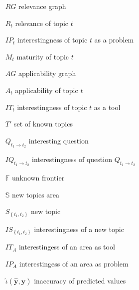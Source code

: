 \begin{itemize}
\item [$RG$] relevance graph
\item [$R_{t}$] relevance of topic $t$
\item [$IP_{t}$] interestingness of topic $t$ as a problem
\item [$M_{t}$] maturity of topic $t$
\item [$AG$] applicability graph
\item [$A_{t}$] applicability of topic $t$
\item [$IT_{t}$] interestingness of topic $t$ as a tool

\item [$T'$] set of known topics
\item [$Q_{t_{1} \rightarrow t_{2}}$] interesting question
\item [$IQ_{t_{1} \rightarrow t_{2}}$] interestingness of question $Q_{t_{1} \rightarrow t_{2}}$

\item [$\mathbb{F}$] unknown frontier
\item [$\mathbb{S}$] new topics area
\item [$S_{\left\{ t_{1},t_{2}\right\} }$] new topic
\item [$IS_{\left\{ t_{1},t_{2}\right\} }$] interestingness of a new topic

\item [$IT_{A}$] interestingess of an area as tool
\item [$IP_{A}$] interestingess of an area as problem

%
%

\bigskip

\item [$\hat\iota(\mathbf{\hat{y}}, \mathbf{y})$] inaccuracy of predicted values

\end{itemize}


